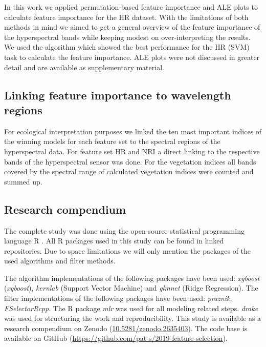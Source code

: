 \documentclass[letterpaper, peerreview]{IEEEtran}
\begin{document}
In this work we applied permutation-based feature importance and \ac{ALE} plots to calculate feature importance for the HR dataset.
With the limitations of both methods in mind we aimed to get a general overview of the feature importance of the hyperspectral bands while keeping modest on over-interpreting the results.
We used the algorithm which showed the best performance for the HR (SVM) task to calculate the feature importance.
ALE plots were not discussed in greater detail and are available as supplementary material.

\subsection{Linking feature importance to wavelength regions}

\noindent For ecological interpretation purposes we linked the ten most important indices of the winning models for each feature set to the spectral regions of the hyperspectral data.
For feature set HR and NRI a direct linking to the respective bands of the hyperspectral sensor was done.
For the vegetation indices all bands covered by the spectral range of calculated vegetation indices were counted and summed up.

\subsection{Research compendium}

\noindent The complete study was done using the open-source statistical programming language R \cite{rcoreteam2019}.
All R packages used in this study can be found in linked repositories.
Due to space limitations we will only mention the packages of the used algorithms and filter methods.

The algorithm implementations of the following packages have been used: \textit{xgboost}\cite{chen2016} (\textit{xgboost}), \textit{kernlab}\cite{kernlab} (Support Vector Machine) and \textit{glmnet}\cite{glmnet} (Ridge Regression).
The filter implementations of the following packages have been used: \textit{praznik\cite{praznik}}, \textit{FSelectorRcpp}\cite{fselectorrcpp}.
The R package \textit{mlr} \cite{mlr} was used for all modeling related steps.
\textit{drake} \cite{drake} was used for structuring the work and reproducibility.
This study is available as a research compendium on Zenodo (\url{10.5281/zenodo.2635403}).
The code base is available on GitHub (\url{https://github.com/pat-s/2019-feature-selection}).
\end{document}
